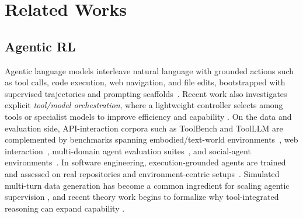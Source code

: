 \section{Related Works}
\label{sec:related}


\subsection{Agentic RL}
Agentic language models interleave natural language with grounded actions such as tool calls, code execution, web navigation, and file edits, bootstrapped with supervised trajectories and prompting scaffolds~\citep{yao2023react,schick2023toolformer}.
Recent work also investigates explicit \emph{tool/model orchestration}, where a lightweight controller selects among tools or specialist models to improve efficiency and capability \citep{su2025toolorchestra}.
On the data and evaluation side, API-interaction corpora such as ToolBench and ToolLLM \citep{xu2023toolbench,qin2023toolllm} are complemented by benchmarks spanning embodied/text-world environments~\citep{shridhar2020alfworld,wang2022scienceworld}, web interaction~\citep{yao2022webshop}, multi-domain agent evaluation suites~\citep{ma2024agentboard}, and social-agent environments~\citep{wang2024sotopiapi}.
In software engineering, execution-grounded agents are trained and assessed on real repositories and environment-centric setups~\citep{wang2025openhandsopenplatformai,pan2025trainingsoftwareengineeringagents}.
Simulated multi-turn data generation has become a common ingredient for scaling agentic supervision \citep{prabhakar2025apigenmtagenticpipelinemultiturn}, and recent theory work begins to formalize why tool-integrated reasoning can expand capability \citep{lin2025tir}.

